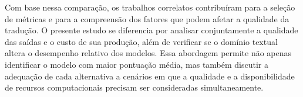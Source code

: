 Com base nessa comparação, os trabalhos correlatos contribuíram para a seleção de métricas e para a compreensão dos fatores que podem afetar a qualidade da tradução. O presente estudo se diferencia por analisar conjuntamente a qualidade das saídas e o custo de sua produção, além de verificar se o domínio textual altera o desempenho relativo dos modelos. Essa abordagem permite não apenas identificar o modelo com maior pontuação média, mas também discutir a adequação de cada alternativa a cenários em que a qualidade e a disponibilidade de recursos computacionais precisam ser consideradas simultaneamente.

